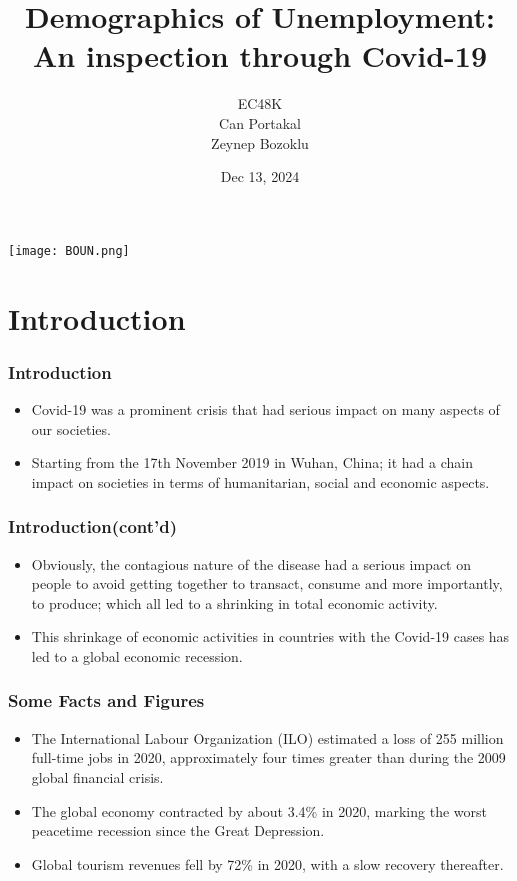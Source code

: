 \documentclass[
	11pt, %
]{beamer}
\title[Demographics of Unemployment: An inspection through Covid-19]{Demographics of Unemployment: An inspection through Covid-19}
\author[EC48K \\ Can Portakal, Zeynep Bozoklu]{{\small EC48K\\ Can Portakal\\Zeynep Bozoklu}}
\institute[BOUN]{Bogazici University}
\date[Dec 13, 2024]{\Small Dec 13, 2024}
\begin{document}
\begin{frame}
    \centering
    \texttt{[image: BOUN.png]} %
    \vspace{0.1cm} %
    \titlepage

\end{frame}


\section{Introduction}

\begin{frame}

    \frametitle{Introduction}

    \begin{itemize}
        \item Covid-19 was a prominent crisis that had serious impact on many aspects of our societies.

        \item Starting from the 17th November 2019 in Wuhan, China; it had a chain impact on societies in terms of humanitarian, social and economic aspects.
    \end{itemize} 
    
    
\end{frame}

\begin{frame}

    \frametitle{Introduction(cont'd)}
    \begin{itemize}
        \item Obviously, the contagious nature of the disease had a serious impact on people to avoid getting together to transact, consume and more importantly, to produce; which all led to a shrinking in total economic activity.
        \item  This shrinkage of economic activities in countries with the Covid-19 cases has led to a global economic recession.
        
    \end{itemize}
    
    \end{frame}

\begin{frame}
   \frametitle{Some Facts and Figures}
    \begin{itemize}
        \item The International Labour Organization (ILO) estimated a loss of 255 million full-time jobs in 2020, approximately four times greater than during the 2009 global financial crisis.
        \item The global economy contracted by about 3.4\% in 2020, marking the worst peacetime recession since the Great Depression.
        \item Global tourism revenues fell by 72\% in 2020, with a slow recovery thereafter.
    \end{itemize}
    
    

\end{frame}
\end{document}
